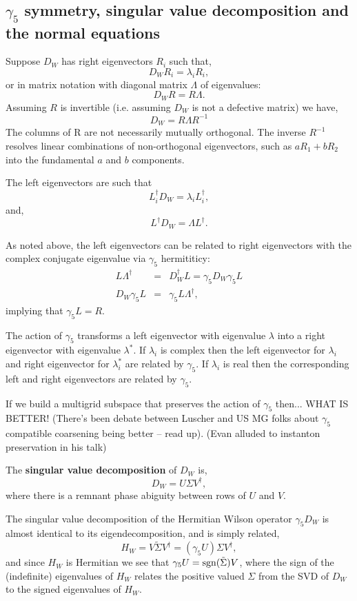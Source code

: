 \documentclass[letter,10pt]{report}
\begin{document}
\subsection{$\gamma_5$ symmetry, singular value decomposition and the normal equations}

Suppose $D_W$ has right eigenvectors $R_i$ such that,
$$
D_W R_i = \lambda_i R_i,
$$
or in matrix notation with diagonal matrix $\Lambda$ of eigenvalues:
$$
D_W R = R \Lambda.
$$
Assuming $R$ is invertible (i.e. assuming $D_W$ is not a defective matrix) we have,
$$
D_W = R \Lambda R^{-1}
$$
The columns of R are not necessarily mutually orthogonal. The inverse $R^{-1}$ resolves
linear combinations of non-orthogonal eigenvectors, such as $a R_1 + b R_2$ into the fundamental
$a$ and $b$ components.


The left eigenvectors are such that
$$
L_i^\dagger D_W = \lambda_i L_i^\dagger, 
$$
and,
$$
L^\dagger D_W = \Lambda L^\dagger.
$$

As noted above, the left eigenvectors can be related to right eigenvectors with the complex conjugate eigenvalue via $\gamma_5$ hermititicy:
\begin{eqnarray}
  L \Lambda^\dagger &=& D_W^\dagger L = \gamma_5 D_W \gamma_5 L \\
  D_W \gamma_5 L &=& \gamma_5 L \Lambda^\dagger,
\end{eqnarray}
implying that $\gamma_5 L = R$.

The action of $\gamma_5$ transforms a left eigenvector with eigenvalue $\lambda$ into a right eigenvector with eigenvalue $\lambda^\ast$.
If $\lambda_i$ is complex then the left eigenvector for $\lambda_i$ and right eigenvector for $\lambda_i^\ast$ are related by $\gamma_5$.
If $\lambda_i$ is real then the corresponding left and right eigenvectors are related by $\gamma_5$.

If we build a multigrid subspace that preserves the action of $\gamma_5$ then... WHAT IS BETTER!
(There's been debate between Luscher and US MG folks about $\gamma_5$ compatible coarsening being better -- read up).
(Evan alluded to instanton preservation in his talk)

The {\bf singular value decomposition} of $D_W$ is,
$$
D_W = U \Sigma V^\dagger,
$$
where there is a remnant phase abiguity between rows of $U$ and $V$.

The singular value decomposition of the Hermitian Wilson operator  $\gamma_5 D_W$ is
almost identical to its eigendecomposition, and is simply related,
$$
H_W = V \tilde\Sigma V^\dagger = (\gamma_5 U) \Sigma V^\dagger,
$$
and since $H_W$ is Hermitian we see that $\gamma_5 U = {\rm sgn}(\tilde\Sigma) V$,
where the sign of the (indefinite) eigenvalues of $H_W$ relates the positive
valued $\Sigma$ from the SVD of $D_W$ to the signed eigenvalues of $H_W$.
\end{document}
